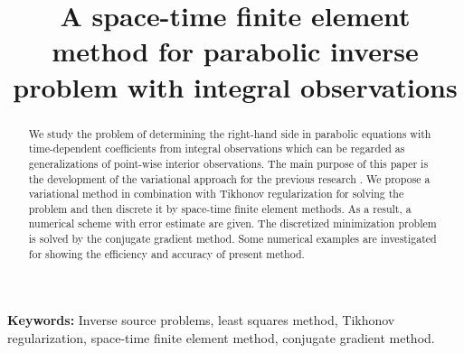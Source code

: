 \documentclass[]{article}
\title{A space-time finite element method for parabolic inverse problem with integral observations}
\begin{document}
\justifying
\maketitle
\begin{abstract}
We study the problem of determining the right-hand side in
parabolic equations with time-dependent coefficients from integral observations which can be regarded as generalizations of point-wise interior observations. The main purpose of this paper is the development of the variational approach for the previous research \cite{a13}.
We propose a variational method in combination with Tikhonov regularization for solving the problem and then discrete it by space-time finite element methods. As a result, a numerical scheme with error estimate are given.
The discretized minimization problem is solved by the conjugate gradient method. Some numerical examples are investigated for showing the efficiency and accuracy
of present method.
\end{abstract}

\textbf{Keywords:} Inverse source problems, least squares method, Tikhonov regularization, space-time finite element method, conjugate gradient method.
\end{document}
